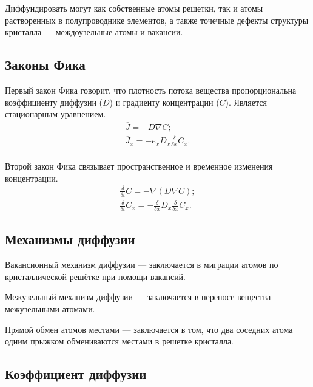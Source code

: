 Диффундировать могут как собственные атомы решетки, так и атомы растворенных в полупроводнике элементов, а также точечные дефекты структуры кристалла — междоузельные атомы и вакансии.

\subsection{Законы Фика}
Первый закон Фика говорит, что плотность потока вещества пропорциональна коэффициенту диффузии ($D$) и градиенту концентрации ($C$). Является стационарным уравнением.
\begin{gather}
	\overline{J} = - D \nabla C;\\
	\overline{J}_{x} = - \overline{e}_{x}D_{x} \frac{\delta}{\delta x} C_{x}.\\
\end{gather}

Второй закон Фика связывает пространственное и временное изменения концентрации.
\begin{gather}
	\label{eq:F2}
	\frac{\delta}{\delta t}C = - \nabla (D \nabla C);\\
	\frac{\delta}{\delta t}C_{x} = - \frac{\delta}{\delta x} D_{x} \frac{\delta}{\delta x} C_{x}.
\end{gather}

\subsection{Механизмы диффузии}

Вакансионный механизм диффузии — заключается в миграции атомов по кристаллической решётке при помощи вакансий.

Межузельный механизм диффузии — заключается в переносе вещества межузельными атомами.

Прямой обмен атомов местами — заключается в том, что два соседних атома одним прыжком обмениваются местами в решетке кристалла.

\subsection{Коэффициент диффузии}

